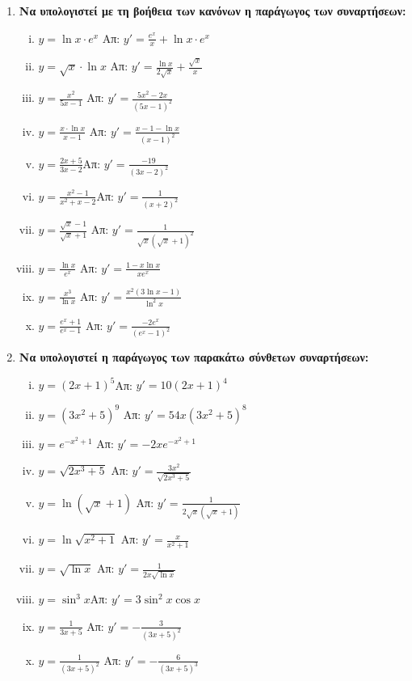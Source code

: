 \begin{enumerate}
  \item {\bfseries Να υπολογιστεί με τη βοήθεια των κανόνων η παράγωγος των συναρτήσεων:}
    \begin{enumerate}[i)]
      \item $ y= \ln{x} \cdot e^{x} $ 
        \hfill Απ: $ y'= \frac{e^{x}}{x} + \ln{x}\cdot e^{x} $ 
      \item $ y= \sqrt{x}\cdot \ln{x} $ 
        \hfill Απ: $ y'= \frac{\ln{x}}{2 \sqrt{ x }}  + \frac{\sqrt{ x }}{x} $ 
      \item $ y= \frac{x^{2}}{5x-1} $ \hfill Απ: $ y'= \frac{5x^{2}-2x}{(5x-1)^{2}} $  
      \item $ y = \frac{x\cdot \ln{x}}{x-1} $ 
        \hfill Απ: $ y' = \frac{x-1- \ln{x}}{(x-1)^{2}} $ 
      \item $y=\frac{2x+5}{3x-2}$\hfill Απ: $y'=\frac{-19}{(3x-2)^2}$
      \item $y=\frac{x^2-1}{x^2+x-2}$\hfill Απ: $y'=\frac{1}{(x+2)^2}$
      \item $y=\frac{\sqrt{x}-1}{\sqrt{x}+1}$
        \hfill Απ: $y'=\frac{1}{\sqrt{x}(\sqrt{x}+1)^2}$
      \item $ y= \frac{\ln{x}}{e^{x}} $ \hfill Απ: $ y'= \frac{1 - x \ln{x}}{xe^{x}} $ 
      \item $ y= \frac{x^{3}}{\ln{x}} $ 
        \hfill Απ: $ y' = \frac{x^{2}(3 \ln{x} -1)}{\ln^{2}{x} } $ 
      \item $ y= \frac{e^{x}+1}{e^{x}-1} $ 
        \hfill Απ: $ y'= \frac{-2e^{x}}{(e^{x}-1)^{2}} $ 
    \end{enumerate}

  \item {\bfseries Να υπολογιστεί η παράγωγος των παρακάτω σύνθετων συναρτήσεων:}
    \begin{enumerate}[i)]
      \item $y=(2x+1)^5$\hfill Απ: $y'=10(2x+1)^4$
      \item $ y=(3x^{2}+5)^{9} $ \hfill Απ: $ y'=54x(3x^{2}+5)^{8} $ 
      \item $ y=e^{-x^{2}+1} $ \hfill Απ: $ y'=-2x e^{-x^{2}+1} $ 
      \item $ y= \sqrt{2x^{3}+5} $ \hfill Απ: $ y'= \frac{3x^{2}}{\sqrt{2x^{3}+5}} $ 
      \item $ y= \ln{(\sqrt{ x } +1)} $ 
        \hfill Απ: $ y'= \frac{1}{2 \sqrt{ x } (\sqrt{ x } +1)} $ 
      \item $y= \ln{\sqrt{x^{2}+1}} $ \hfill Απ: $ y'= \frac{x}{x^{2}+1} $ 
      \item $ y= \sqrt{ \ln{x} } $ \hfill Απ: $ y'=\frac{1}{2x \sqrt{ \ln{x} }} $ 
      \item $y=\sin^3 x$\hfill Απ: $y'=3\sin^2x \cos x$
      \item $y= \frac{1}{3x+5}$ \hfill Απ: $ y'= - \frac{3}{(3x+5)^{2}} $ 
      \item $y= \frac{1}{(3x+5)^{2}}$ \hfill Απ: $ y'= - \frac{6}{(3x+5)^{3}} $ 
    \end{enumerate}
\end{enumerate}








